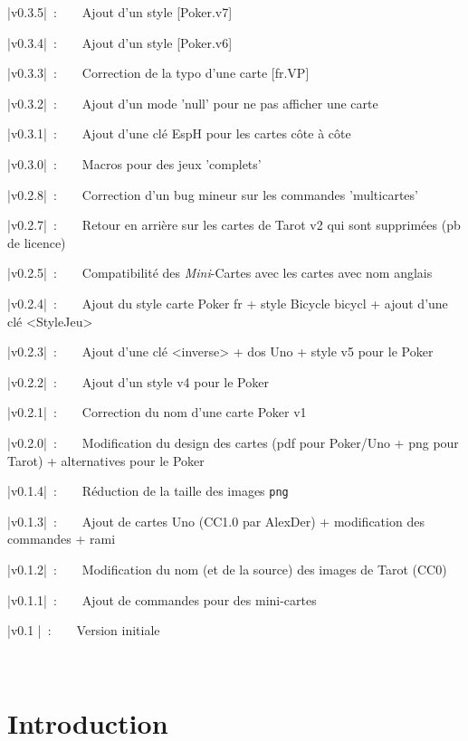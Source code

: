 \documentclass[a4paper]{article}
\begin{document}
{\small \bverb|v0.3.5|~:~~~~Ajout d'un style [Poker.v7]}

{\small \bverb|v0.3.4|~:~~~~Ajout d'un style [Poker.v6]}

{\small \bverb|v0.3.3|~:~~~~Correction de la typo d'une carte [fr.VP]}

{\small \bverb|v0.3.2|~:~~~~Ajout d'un mode 'null' pour ne pas afficher une carte}

{\small \bverb|v0.3.1|~:~~~~Ajout d'une clé \textsf{EspH} pour les cartes côte à côte}

{\small \bverb|v0.3.0|~:~~~~Macros pour des jeux 'complets'}

{\small \bverb|v0.2.8|~:~~~~Correction d'un bug mineur sur les commandes 'multicartes'}

{\small \bverb|v0.2.7|~:~~~~Retour en arrière sur les cartes de Tarot \textsf{v2} qui sont supprimées (pb de licence)}

{\small \bverb|v0.2.5|~:~~~~Compatibilité des \textit{Mini}-Cartes avec les cartes avec nom anglais}

{\small \bverb|v0.2.4|~:~~~~Ajout du style carte Poker \textsf{fr} + style Bicycle \textsf{bicycl} + ajout d'une clé \textsf{<StyleJeu>}}

{\small \bverb|v0.2.3|~:~~~~Ajout d'une clé \textsf{<inverse>} + dos Uno + style \textsf{v5} pour le Poker}

{\small \bverb|v0.2.2|~:~~~~Ajout d'un style \textsf{v4} pour le Poker}

{\small \bverb|v0.2.1|~:~~~~Correction du nom d'une carte Poker \textsf{v1}}

{\small \bverb|v0.2.0|~:~~~~Modification du design des cartes (pdf pour Poker/Uno + png pour Tarot) + alternatives pour le Poker}

{\small \bverb|v0.1.4|~:~~~~Réduction de la taille des images \texttt{png}}

{\small \bverb|v0.1.3|~:~~~~Ajout de cartes Uno (CC1.0 par AlexDer) + modification des commandes + rami}

{\small \bverb|v0.1.2|~:~~~~Modification du nom (et de la source) des images de Tarot (CC0)}

{\small \bverb|v0.1.1|~:~~~~Ajout de commandes pour des mini-cartes}

{\small \bverb|v0.1  |~:~~~~Version initiale}

\vfill~

\newpage

\part*{Introduction}
\end{document}

